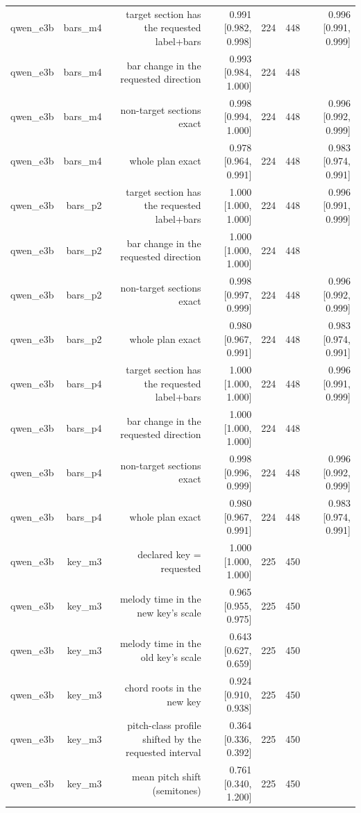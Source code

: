 \begin{table}[t]
\begin{tabular}{lrrrrrr}
qwen\_e3b & bars\_m4 & target section has the requested label+bars & 0.991 [0.982, 0.998] & 224 & 448 & 0.996 [0.991, 0.999] \\
qwen\_e3b & bars\_m4 & bar change in the requested direction & 0.993 [0.984, 1.000] & 224 & 448 &  \\
qwen\_e3b & bars\_m4 & non-target sections exact & 0.998 [0.994, 1.000] & 224 & 448 & 0.996 [0.992, 0.999] \\
qwen\_e3b & bars\_m4 & whole plan exact & 0.978 [0.964, 0.991] & 224 & 448 & 0.983 [0.974, 0.991] \\
qwen\_e3b & bars\_p2 & target section has the requested label+bars & 1.000 [1.000, 1.000] & 224 & 448 & 0.996 [0.991, 0.999] \\
qwen\_e3b & bars\_p2 & bar change in the requested direction & 1.000 [1.000, 1.000] & 224 & 448 &  \\
qwen\_e3b & bars\_p2 & non-target sections exact & 0.998 [0.997, 0.999] & 224 & 448 & 0.996 [0.992, 0.999] \\
qwen\_e3b & bars\_p2 & whole plan exact & 0.980 [0.967, 0.991] & 224 & 448 & 0.983 [0.974, 0.991] \\
qwen\_e3b & bars\_p4 & target section has the requested label+bars & 1.000 [1.000, 1.000] & 224 & 448 & 0.996 [0.991, 0.999] \\
qwen\_e3b & bars\_p4 & bar change in the requested direction & 1.000 [1.000, 1.000] & 224 & 448 &  \\
qwen\_e3b & bars\_p4 & non-target sections exact & 0.998 [0.996, 0.999] & 224 & 448 & 0.996 [0.992, 0.999] \\
qwen\_e3b & bars\_p4 & whole plan exact & 0.980 [0.967, 0.991] & 224 & 448 & 0.983 [0.974, 0.991] \\
qwen\_e3b & key\_m3 & declared key = requested & 1.000 [1.000, 1.000] & 225 & 450 &  \\
qwen\_e3b & key\_m3 & melody time in the new key's scale & 0.965 [0.955, 0.975] & 225 & 450 &  \\
qwen\_e3b & key\_m3 & melody time in the old key's scale & 0.643 [0.627, 0.659] & 225 & 450 &  \\
qwen\_e3b & key\_m3 & chord roots in the new key & 0.924 [0.910, 0.938] & 225 & 450 &  \\
qwen\_e3b & key\_m3 & pitch-class profile shifted by the requested interval & 0.364 [0.336, 0.392] & 225 & 450 &  \\
qwen\_e3b & key\_m3 & mean pitch shift (semitones) & 0.761 [0.340, 1.200] & 225 & 450 &  \\

\end{tabular}
\end{table}
